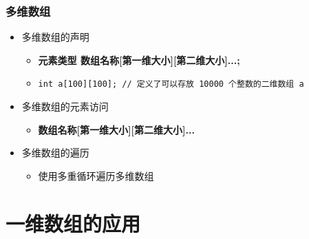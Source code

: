 \begin{frame}[fragile]
    \frametitle{多维数组}

    \begin{itemize}[<+->]
        \item 多维数组的声明
        
            \begin{itemize}
                \item \textbf{元素类型 \enspace 数组名称[第一维大小][第二维大小]...;}
                \item \lstinline|int a[100][100]; // 定义了可以存放 10000 个整数的二维数组 a|
            \end{itemize}

        \item 多维数组的元素访问
        
            \begin{itemize}
                \item \textbf{数组名称[第一维大小][第二维大小]...}
            \end{itemize}

        \item 多维数组的遍历
        
            \begin{itemize}
                \item 使用多重循环遍历多维数组
            \end{itemize}

    \end{itemize}
\end{frame}


\section{一维数组的应用}

